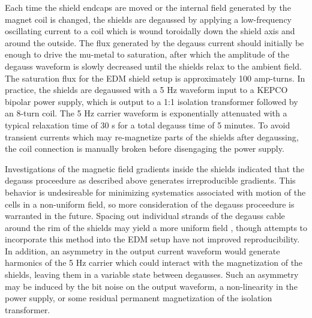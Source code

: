 \documentclass [10pt, twoside] {uwthesis}[2012/04/02]
\begin{document}
Each time the shield endcaps are moved or the internal field generated by the magnet coil is changed, the shields are degaussed by applying a low-frequency oscillating current to a coil which is wound toroidally down the shield axis and around the outside. The flux generated by the degauss current should initially be enough to drive the mu-metal to saturation, after which the amplitude of the degauss waveform is slowly decreased until the shields relax to the ambient field. The saturation flux for the EDM shield setup is approximately 100 amp-turns. In practice, the shields are degaussed with a 5 Hz waveform input to a KEPCO bipolar power supply, which is output to a 1:1 isolation transformer followed by an 8-turn coil. The 5 Hz carrier waveform is exponentially attenuated with a typical relaxation time of 30 s for a total degauss time of 5 minutes. To avoid transient currents which may re-magnetize parts of the shields after degaussing, the coil connection is manually broken before disengaging the power supply. 

Investigations of the magnetic field gradients inside the shields indicated that the degauss proceedure as described above generates irreproducible gradients. This behavior is undesireable for minimizing systematics associated with motion of the cells in a non-uniform field, so more consideration of the degauss proceedure is warranted in the future. Spacing out individual strands of the degauss cable around the rim of the shields may yield a more uniform field \cite{Fierlinger}, though attempts to incorporate this method into the EDM setup have not improved reproducibility. In addition, an asymmetry in the output current waveform would generate harmonics of the 5 Hz carrier which could interact with the magnetization of the shields, leaving them in a variable state between degausses. Such an asymmetry may be induced by the bit noise on the output waveform, a non-linearity in the power supply, or some residual permanent magnetization  of the isolation transformer. 
\end{document}
